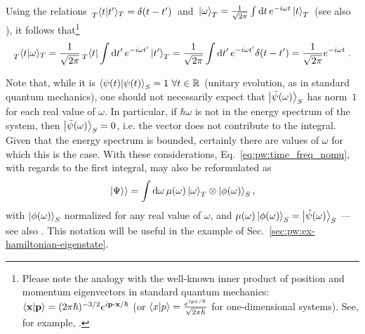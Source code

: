 Using the relations
$
\, \prescript{}{T}{\braket{t}{t'}}_T = \delta(t-t') \,
$
and
$
  \,
  \ket{\omega}_T =
  \frac{1}{\sqrt{2\pi}} \int\dd{t}e^{-i\omega t}\ket{t}_T
  \,
$
(see also \cite[2]{Lloyd:Time}),
it follows that\footnote{%
  Please note the analogy with the well-known
  inner product of position and momentum eigenvectors in standard quantum mechanics:
  $\braket{\vb{x}}{\vb{p}} = (2\pi\hbar)^{-3/2}\E^{\iu \vb{p} \vdot \vb{x}  / \hbar}$
  (or $\braket{x}{p} = \frac{e^{i p x / \hbar}}{\sqrt{2\pi\hbar}}$ for one-dimensional systems).
  See, for example, \cite[126--127]{Ballentine}.
}
\begin{equation}\label{eq:pw:tscalaromega}
  \prescript{}{T}{\braket{t}{\omega}}_T =
  \frac{1}{\sqrt{2\pi}}\prescript{}{T}{\bra{t}} \int\dd{t'}e^{-i\omega t'}\ket{t'}_T  =
  \frac{1}{\sqrt{2\pi}}\int\dd{t'}e^{-i\omega t'}\delta(t-t') =
  \frac{1}{\sqrt{2\pi}} e^{-i\omega t} \; \text{.}
\end{equation}

Note that,
while it is $\braket{\psi(t)}_S = 1 \ \forall t \in \mathbb{R}$ (unitary evolution,
as in standard quantum mechanics),
one should not necessarily expect that
$\ket{\tilde{\psi}(\omega)}_S$ has norm~$1$ for each real value of $\omega$.
In particular, if $\hbar\omega$ is not in the energy spectrum of the system,
then $\ket{\tilde{\psi}(\omega)}_S = 0$, i.e. the vector does not contribute to the integral.
Given that the energy spectrum is bounded,
certainly there are values of $\omega$ for which this is the case.
With these considerations, Eq.~\eqref{eq:pw:time_freq_nomu}, with regards to the first integral, may also be reformulated as
\begin{equation}\label{eq:pw:time_freq_mu}
  \left.\left| \Psi \right\rangle\right\rangle =
    \int \dd{\omega} \mu(\omega) \ket{\omega}_{T} \otimes \ket{\phi(\omega)}_{S} \text{,}
\end{equation}
with $\ket{\phi(\omega)}_{S}$ normalized for any real value of $\omega$,
and $\mu(\omega)\ket{\phi(\omega)}_{S} = \ket{\tilde{\psi}(\omega)}_S$
--- see also \cite[eq.~(10)]{Lloyd:Time}.
This notation will be useful in the example of Sec.~\ref{sec:pw:ex-hamiltonian-eigenstate}.

